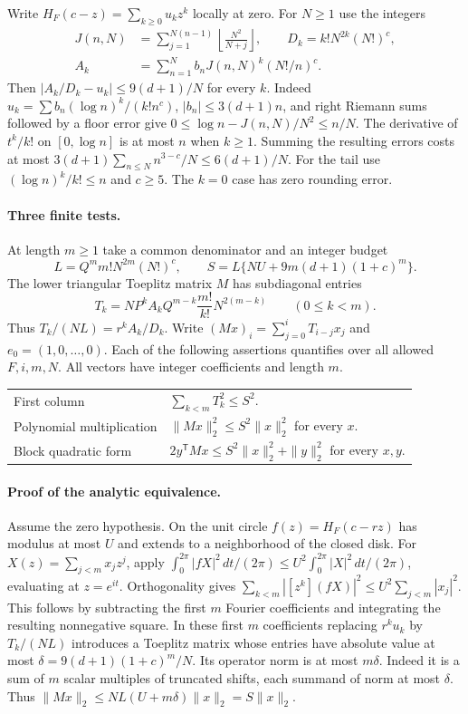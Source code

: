Write $H_F(c-z)=\sum_{k\ge0}u_k z^k$ locally at zero. For $N\ge1$ use the integers
\[
 \begin{split}
 J(n,N)&=\sum_{j=1}^{N(n-1)}\left\lfloor\frac{N^2}{N+j}\right\rfloor,\qquad
 D_k=k!N^{2k}(N!)^c,\\
 A_k&=\sum_{n=1}^N b_n J(n,N)^k(N!/n)^c.
 \end{split}
\]
Then $|A_k/D_k-u_k|\le9(d+1)/N$ for every $k$. Indeed $u_k=\sum b_n(\log n)^k/(k!n^c)$, $|b_n|\le3(d+1)n$, and right Riemann sums followed by a floor error give $0\le\log n-J(n,N)/N^2\le n/N$. The derivative of $t^k/k!$ on $[0,\log n]$ is at most $n$ when $k\ge1$. Summing the resulting errors costs at most $3(d+1)\sum_{n\le N}n^{3-c}/N\le6(d+1)/N$. For the tail use $(\log n)^k/k!\le n$ and $c\ge5$. The $k=0$ case has zero rounding error.

\paragraph{Three finite tests.}
At length $m\ge1$ take a common denominator and an integer budget
\[
 L=Q^m m! N^{2m}(N!)^c,\qquad
 S=L\{NU+9m(d+1)(1+c)^m\}.
\]
The lower triangular Toeplitz matrix $M$ has subdiagonal entries
\[
 T_k=N P^k A_k Q^{m-k}\frac{m!}{k!}N^{2(m-k)}
 \qquad(0\le k<m).
\]
Thus $T_k/(NL)=r^k A_k/D_k$. Write $(Mx)_i=\sum_{j=0}^{i}T_{i-j}x_j$ and $e_0=(1,0,\ldots,0)$. Each of the following assertions quantifies over all allowed $F,i,m,N$. All vectors have integer coefficients and length $m$.
\begin{center}
\begin{tabular}{@{}ll@{}}
First column & $\sum_{k<m}T_k^2\le S^2$.\\[2pt]
Polynomial multiplication & $\|Mx\|_2^2\le S^2\|x\|_2^2$ for every $x$.\\[2pt]
Block quadratic form & $2y^{\mathsf T}Mx\le S^2\|x\|_2^2+\|y\|_2^2$ for every $x,y$.
\end{tabular}
\end{center}

\paragraph{Proof of the analytic equivalence.}
Assume the zero hypothesis. On the unit circle $f(z)=H_F(c-rz)$ has modulus at most $U$ and extends to a neighborhood of the closed disk. For $X(z)=\sum_{j<m}x_j z^j$, apply $\int_0^{2\pi}|fX|^2\,dt/(2\pi)\le U^2\int_0^{2\pi}|X|^2\,dt/(2\pi)$, evaluating at $z=e^{it}$. Orthogonality gives $\sum_{k<m}|[z^k](fX)|^2\le U^2\sum_{j<m}|x_j|^2$. This follows by subtracting the first $m$ Fourier coefficients and integrating the resulting nonnegative square. In these first $m$ coefficients replacing $r^ku_k$ by $T_k/(NL)$ introduces a Toeplitz matrix whose entries have absolute value at most $\delta=9(d+1)(1+c)^m/N$. Its operator norm is at most $m\delta$. Indeed it is a sum of $m$ scalar multiples of truncated shifts, each summand of norm at most $\delta$. Thus $\|Mx\|_2\le NL(U+m\delta)\|x\|_2=S\|x\|_2$.

